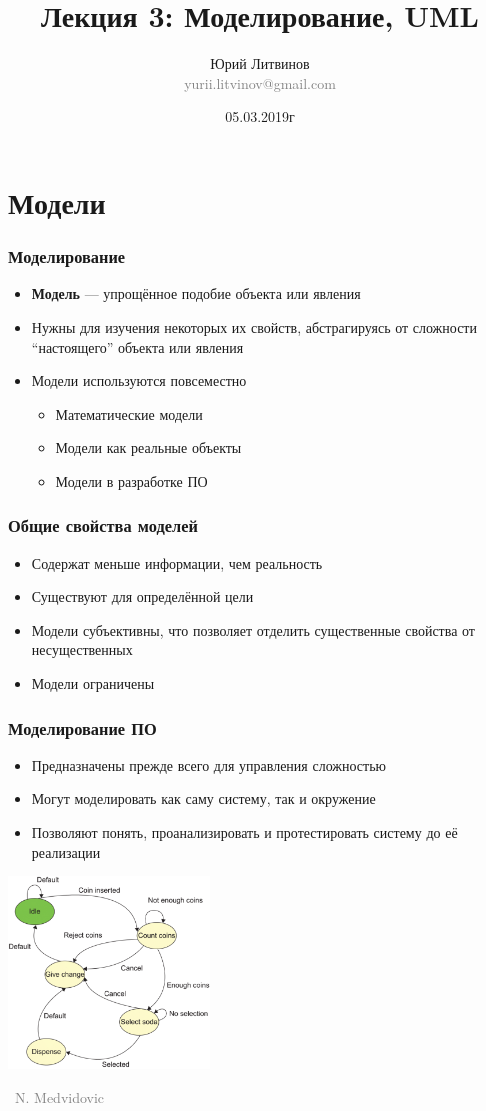 \documentclass[xetex,mathserif,serif]{beamer}
\title[Моделирование]{Лекция 3: Моделирование, UML}
\author[Юрий Литвинов]{Юрий Литвинов\\\small{\textcolor{gray}{yurii.litvinov@gmail.com}}}
\date{05.03.2019г}
\newcommand{\attribution}[1] {
	\vspace{-5mm}\begin{flushright}\begin{scriptsize}\textcolor{gray}{\textcopyright\, #1}\end{scriptsize}\end{flushright}
}
\begin{document}
	\frame{\titlepage}

	\section{Модели}

	\begin{frame}
		\frametitle{Моделирование}
		\begin{itemize}
			\item \textbf{Модель} --- упрощённое подобие объекта или явления
			\item Нужны для изучения некоторых их свойств, абстрагируясь от сложности ``настоящего'' объекта или явления
			\item Модели используются повсеместно
			\begin{itemize}
				\item Математические модели
				\item Модели как реальные объекты
				\item Модели в разработке ПО
			\end{itemize}
		\end{itemize}
	\end{frame}

	\begin{frame}
		\frametitle{Общие свойства моделей}
		\begin{itemize}
			\item Содержат меньше информации, чем реальность
			\item Существуют для определённой цели
			\item Модели субъективны, что позволяет отделить существенные свойства от несущественных
			\item Модели ограничены
		\end{itemize}

	\end{frame}

	\begin{frame}
		\frametitle{Моделирование ПО}
		\begin{itemize}
			\item Предназначены прежде всего для управления сложностью
			\item Могут моделировать как саму систему, так и окружение
			\item Позволяют понять, проанализировать и протестировать систему до её реализации
		\end{itemize}
		\begin{center}
			\includegraphics[width=0.4\textwidth]{vendingMachine.png}
			\attribution{N. Medvidovic}
		\end{center}
	\end{frame}
\end{document}
